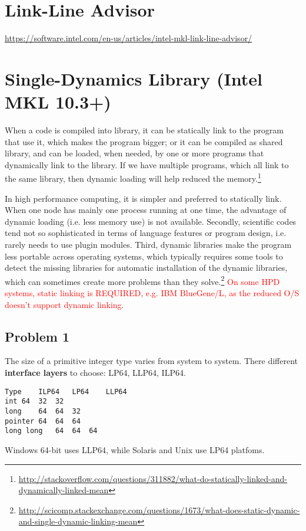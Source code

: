 \section{Link-Line Advisor}
\label{sec:LinkLine-Advisor}


\url{https://software.intel.com/en-us/articles/intel-mkl-link-line-advisor/}


\section[SDL]{Single-Dynamics Library (Intel MKL 10.3+)}
\label{sec:SDL}

When a code is compiled into library, it can be statically link to the program
that use it, which makes the program bigger; or it can be compiled as shared
library, and can be loaded, when needed, by one or more programs that
dynamically link to the library. If we have multiple programs, which all link to
the same library, then dynamic loading will help reduced the
memory.\footnote{\url{http://stackoverflow.com/questions/311882/what-do-statically-linked-and-dynamically-linked-mean}}

In high performance computing, it is simpler and preferred to statically link.
When one node has mainly one process running at one time, the advantage of
dynamic loading (i.e. less memory use) is not available. Secondly, scientific
codes tend not so sophisticated in terms of language features or program design,
i.e. rarely needs to use plugin modules. Third, dynamic libraries make the
program less portable across operating systems, which typically requires some
tools to detect the missing libraries for automatic installation of the dynamic
libraries, which can sometimes create more problems than they
solve.\footnote{\url{http://scicomp.stackexchange.com/questions/1673/what-does-static-dynamic-and-single-dynamic-linking-mean}}
\textcolor{red}{On some HPD systems, static linking is REQUIRED, e.g. IBM
BlueGene/L, as the reduced O/S doesn't support dynamic linking}. 

\subsection{Problem 1}

The size of a primitive integer type varies from system to system. There
different {\bf interface layers} to choose: LP64, LLP64, ILP64.
\begin{Verbatim}
Type	ILP64	LP64	LLP64
int	64	32	32
long	64	64	32
pointer	64	64	64
long long	64	64	64
\end{Verbatim}
Windows 64-bit uses LLP64, while Solaris and Unix use LP64 platfoms. 


